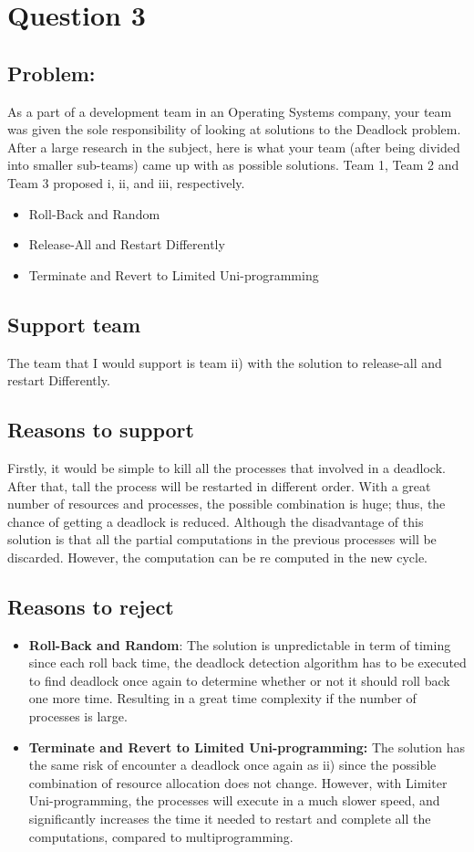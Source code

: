 \newpage
\section{Question 3}
\subsection{Problem:}
As a part of a development team in an Operating Systems company, your team was given the sole
responsibility of looking at solutions to the Deadlock problem. After a large research in the subject, here
is what your team (after being divided into smaller sub-teams) came up with as possible solutions. Team
1, Team 2 and Team 3 proposed i, ii, and iii, respectively.

\begin{itemize}
    \item Roll-Back and Random
    \item Release-All and Restart Differently
    \item Terminate and Revert to Limited Uni-programming 
\end{itemize}

\subsection{Support team}
The team that I would support is team ii) with the solution to release-all and restart Differently.

\subsection{Reasons to support}
Firstly, it would be simple to kill all the processes that involved in a deadlock. After that, tall the process will be restarted in different order. With a great number of resources and processes, the possible combination is huge; thus, the chance of getting a deadlock is reduced. Although the disadvantage of this solution is that all the partial computations in the previous processes will be discarded. However, the computation can be re computed in the new cycle.

\subsection{Reasons to reject}
\begin{itemize}
    \item \textbf{Roll-Back and Random}: The solution is unpredictable in term of timing since each roll back time, the deadlock detection algorithm has to be executed to find deadlock once again to determine whether or not it should roll back one more time. Resulting in a great time complexity if the number of processes is large.
    \item \textbf{Terminate and Revert to Limited Uni-programming:} The solution has the same risk of encounter a deadlock once again as ii) since the possible combination of resource allocation does not change. However, with Limiter Uni-programming, the processes will execute in a much slower speed, and significantly increases the time it needed to restart and complete all the computations, compared to multiprogramming.
\end{itemize}
